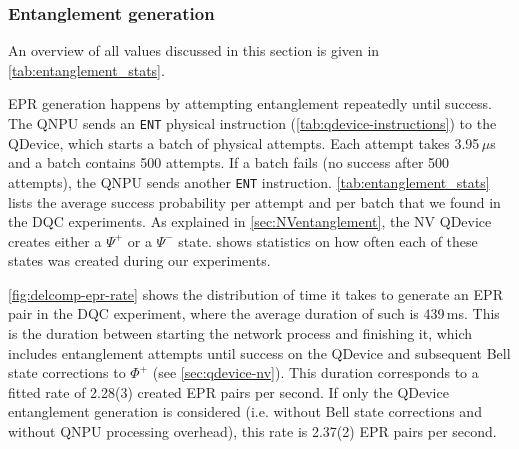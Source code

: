 \subsubsection{Entanglement generation}

An overview of all values discussed in this section is given in \cref{tab:entanglement_stats}.

\ac{EPR} generation happens by attempting entanglement repeatedly until success. The \ac{QNPU} sends an \texttt{ENT} physical instruction (\cref{tab:qdevice-instructions}) to the \ac{QDevice}, which starts a batch of physical attempts. Each attempt takes 3.95\,$\mu$s and a batch contains 500 attempts. If a batch fails (no success after 500 attempts), the \ac{QNPU} sends another \texttt{ENT} instruction. \cref{tab:entanglement_stats} lists the average success probability per attempt and per batch that we found in the \ac{DQC} experiments. As explained in \cref{sec:NVentanglement}, the \ac{NV} \ac{QDevice} creates either a $\Psi^+$ or a $\Psi^-$ state.  shows statistics on how often each of these states was created during our experiments.

\cref{fig:delcomp-epr-rate} shows the distribution of time it takes to generate an \ac{EPR} pair in the \ac{DQC} experiment, where the average duration of such is 439\,ms. This is the duration between starting the network process and finishing it, which includes entanglement attempts until success on the \ac{QDevice} and subsequent Bell state corrections to $\Phi^+$ (see \cref{sec:qdevice-nv}). This duration corresponds to a fitted rate of 2.28(3) created \ac{EPR} pairs per second. If only the \ac{QDevice} entanglement generation is considered (i.e. without Bell state corrections and without \ac{QNPU} processing overhead), this rate is 2.37(2) \ac{EPR} pairs per second.

